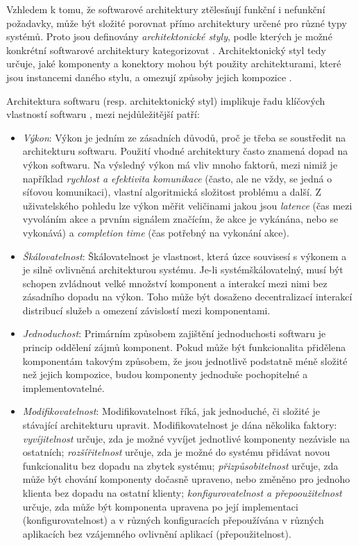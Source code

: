 Vzhledem k tomu, že softwarové architektury ztělesňují funkční i nefunkční požadavky, může být složité porovnat přímo architektury určené pro různé typy systémů. Proto jsou definovány \textit{architektonické styly}, podle kterých je možné konkrétní softwarové architektury kategorizovat \cite{Nitto99}. Architektonický styl tedy určuje, jaké komponenty a konektory mohou být použity architekturami, které jsou instancemi daného stylu, a omezují způsoby jejich kompozice \cite{Garlan95}.  

Architektura softwaru (resp. architektonický styl) implikuje řadu klíčových vlastností softwaru \cite{Ghezzi03}, mezi nejdůležitější patří: 
\begin{itemize}
  \item{\textit{Výkon}}: Výkon je jedním ze zásadních důvodů, proč je třeba se soustředit na architekturu softwaru. Použití vhodné architektury často znamená dopad na výkon softwaru. Na výsledný výkon má vliv mnoho faktorů, mezi nimiž je například \textit{rychlost a efektivita komunikace} (často, ale ne vždy, se jedná o síťovou komunikaci), vlastní algoritmická složitost problému a další. Z uživatelského pohledu lze výkon měřit veličinami jakou jsou \textit{latence} (čas mezi vyvoláním akce a prvním signálem značícím, že akce je vykánána, nebo se vykonává) a \textit{completion time} (čas potřebný na vykonání akce).
  \item{\textit{Škálovatelnost}}: Škálovatelnost je vlastnost, která úzce souvisesí s výkonem a je silně ovlivněná architekturou systému. Je-li systémškálovatelný, musí být schopen zvládnout velké množství komponent a interakcí mezi nimi bez zásadního dopadu na výkon. Toho může být dosaženo decentralizací interakcí distribucí služeb a omezení závislostí mezi komponentami. %
  \item{\textit{Jednoduchost}}: Primárním způsobem zajištění jednoduchosti softwaru je princip oddělení zájmů komponent. Pokud může být funkcionalita přidělena komponentám takovým způsobem, že jsou jednotlivě podstatně méně složité než jejich kompozice, budou komponenty jednoduše pochopitelné a implementovatelné.  
  \item{\textit{Modifikovatelnost}}: Modifikovatelnost říká, jak jednoduché, či složité je stávající architekturu upravit. Modifikovatelnost je dána několika faktory: \textit{vyvíjitelnost} určuje, zda je možné vyvíjet jednotlivé komponenty nezávisle na ostatních; \textit{rozšířitelnost} určuje, zda je možné do systému přidávat novou funkcionalitu bez dopadu na zbytek systému; \textit{přizpůsobitelnost} určuje, zda může být chování komponenty dočasně upraveno, nebo změněno pro jednoho klienta bez dopadu na ostatní klienty; \textit{konfigurovatelnost a přepooužitelnost} určuje, zda může být komponenta upravena po její implementaci (konfigurovatelnost) a v různých konfiguracích přepoužívána v různých aplikacích bez vzájemného ovlivnění aplikací (přepoužitelnost).

\end{itemize}
